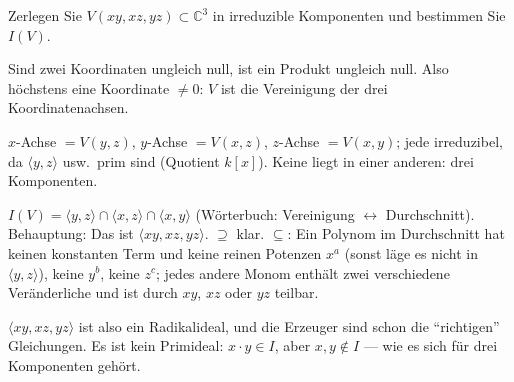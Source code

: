 \begin{aufgabe}
Zerlegen Sie $V(xy, xz, yz)\subset\mathbb C^{3}$ in irreduzible Komponenten und bestimmen Sie $I(V)$.

\loesung
{}
Sind zwei Koordinaten ungleich null, ist ein Produkt ungleich null. Also höchstens eine Koordinate $\ne 0$: $V$ ist die Vereinigung der drei Koordinatenachsen.

$x$-Achse $= V(y, z)$, $y$-Achse $= V(x, z)$, $z$-Achse $= V(x, y)$; jede irreduzibel, da $\langle y, z\rangle$ usw.\ prim sind (Quotient $k[x]$). Keine liegt in einer anderen: drei Komponenten.

$I(V) = \langle y, z\rangle\cap\langle x, z\rangle\cap\langle x, y\rangle$ (Wörterbuch: Vereinigung $\leftrightarrow$ Durchschnitt). Behauptung: Das ist $\langle xy, xz, yz\rangle$. $\supseteq$ klar. $\subseteq$: Ein Polynom im Durchschnitt hat keinen konstanten Term und keine reinen Potenzen $x^{a}$ (sonst läge es nicht in $\langle y, z\rangle$), keine $y^{b}$, keine $z^{c}$; jedes andere Monom enthält zwei verschiedene Veränderliche und ist durch $xy$, $xz$ oder $yz$ teilbar. \checkmark

$\langle xy, xz, yz\rangle$ ist also ein Radikalideal, und die Erzeuger sind schon die \enquote{richtigen} Gleichungen. Es ist kein Primideal: $x\cdot y\in I$, aber $x, y\notin I$ --- wie es sich für drei Komponenten gehört.

\begin{center}
\begin{minipage}{0.88\textwidth}
\end{minipage}
\end{center}
\end{aufgabe}

